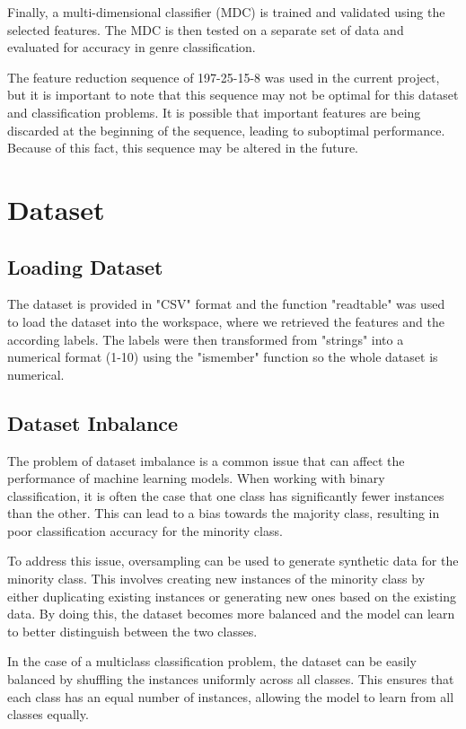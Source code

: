 \documentclass[12pt, a4paper]{article}
\begin{document}
Finally, a multi-dimensional classifier (MDC) is trained and validated using the selected features. The MDC is then tested on a separate set of data and evaluated for accuracy in genre classification.

The feature reduction sequence of 197-25-15-8 was used in the current project, but it is important to note that this sequence may not be optimal for this dataset and classification problems. It is possible that important features are being discarded at the beginning of the sequence, leading to suboptimal performance. Because of this fact, this sequence may be altered in the future. 

\section{Dataset}


\subsection{Loading Dataset}

The dataset is provided in "CSV" format and the function "readtable" was used to load the dataset into the workspace, where we retrieved the features and the according labels. The labels were then transformed from "strings" into a numerical format (1-10) using the "ismember" function so the whole dataset is numerical.


\subsection{Dataset Inbalance}

The problem of dataset imbalance is a common issue that can affect the performance of machine learning models. When working with binary classification, it is often the case that one class has significantly fewer instances than the other. This can lead to a bias towards the majority class, resulting in poor classification accuracy for the minority class.

To address this issue, oversampling can be used to generate synthetic data for the minority class. This involves creating new instances of the minority class by either duplicating existing instances or generating new ones based on the existing data. By doing this, the dataset becomes more balanced and the model can learn to better distinguish between the two classes.

In the case of a multiclass classification problem, the dataset can be easily balanced by shuffling the instances uniformly across all classes. This ensures that each class has an equal number of instances, allowing the model to learn from all classes equally.
\end{document}
